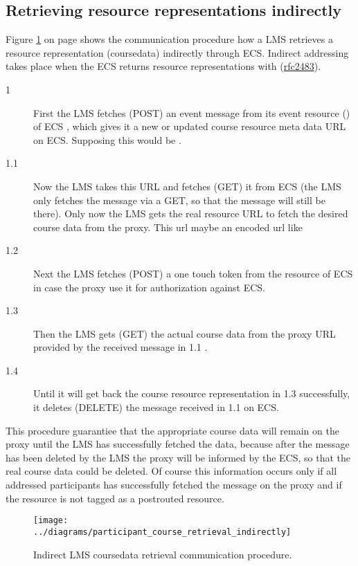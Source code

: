 \subsection{Retrieving resource representations indirectly}\label{heading:participant_coursedata_retrieval_indirectly}
Figure \ref{fig:participant_coursedata_retrieval_indirectly} on page
\pageref{fig:participant_coursedata_retrieval_indirectly} shows the
communication procedure how a LMS retrieves a resource representation
(coursedata) indirectly through ECS. Indirect addressing takes place when the
ECS returns resource representations with  
(\href{http://tools.ietf.org/html/rfc2483#section-5}{rfc2483}).
\begin{description}
  \item[1] First the LMS fetches (POST)  an event message from its event resource
  () of ECS , which gives it a new or updated course
  resource meta data URL on ECS. Supposing this would be .
  \item[1.1] Now the LMS takes this URL and fetches (GET) it from ECS (the LMS
  only fetches the message via a GET, so that the message will still be there).
  Only now the LMS gets the real resource URL to fetch the desired course data
  from the proxy. This url maybe an encoded url like 
  \item[1.2] Next the LMS fetches (POST) a one touch token from the 
  resource of ECS in case the proxy use it for authorization against ECS.
  \item[1.3] Then the LMS gets (GET) the actual course data from the proxy URL
  provided by the received message in 1.1 . 
  \item[1.4] Until it will get back the course resource representation in 1.3
  successfully, it deletes (DELETE) the message 
  received in 1.1 on ECS.
\end{description}
This procedure guarantiee that the appropriate course data will remain on the
proxy until the LMS has successfully fetched the data, because after the
message  has been deleted by the LMS the proxy
will be informed by the ECS, so that the real course data  could be deleted.
Of course this information occurs only if all addressed participants has
successfully fetched the message on the proxy and if the
 resource is not tagged as a postrouted resource. 

\begin{figure}[p]
\noindent \begin{centering}
\texttt{[image: ../diagrams/participant\_course\_retrieval\_indirectly]}
\par\end{centering}
\caption[Indirect LMS coursedata
retrieval]{\label{fig:participant_coursedata_retrieval_indirectly}Indirect LMS
coursedata retrieval communication procedure.}
\end{figure}
